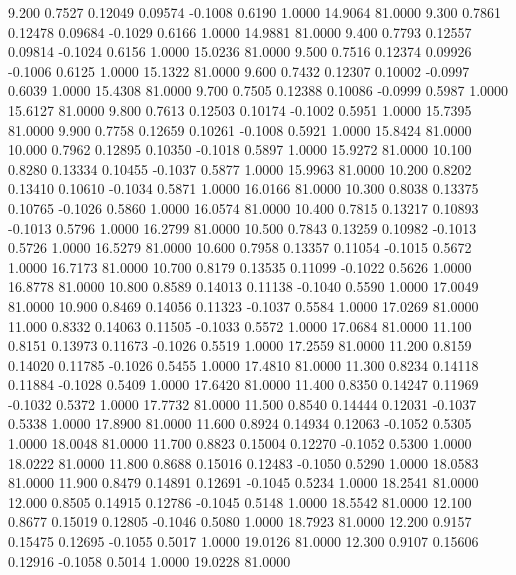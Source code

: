    9.200   0.7527   0.12049   0.09574  -0.1008   0.6190   1.0000  14.9064  81.0000
   9.300   0.7861   0.12478   0.09684  -0.1029   0.6166   1.0000  14.9881  81.0000
   9.400   0.7793   0.12557   0.09814  -0.1024   0.6156   1.0000  15.0236  81.0000
   9.500   0.7516   0.12374   0.09926  -0.1006   0.6125   1.0000  15.1322  81.0000
   9.600   0.7432   0.12307   0.10002  -0.0997   0.6039   1.0000  15.4308  81.0000
   9.700   0.7505   0.12388   0.10086  -0.0999   0.5987   1.0000  15.6127  81.0000
   9.800   0.7613   0.12503   0.10174  -0.1002   0.5951   1.0000  15.7395  81.0000
   9.900   0.7758   0.12659   0.10261  -0.1008   0.5921   1.0000  15.8424  81.0000
  10.000   0.7962   0.12895   0.10350  -0.1018   0.5897   1.0000  15.9272  81.0000
  10.100   0.8280   0.13334   0.10455  -0.1037   0.5877   1.0000  15.9963  81.0000
  10.200   0.8202   0.13410   0.10610  -0.1034   0.5871   1.0000  16.0166  81.0000
  10.300   0.8038   0.13375   0.10765  -0.1026   0.5860   1.0000  16.0574  81.0000
  10.400   0.7815   0.13217   0.10893  -0.1013   0.5796   1.0000  16.2799  81.0000
  10.500   0.7843   0.13259   0.10982  -0.1013   0.5726   1.0000  16.5279  81.0000
  10.600   0.7958   0.13357   0.11054  -0.1015   0.5672   1.0000  16.7173  81.0000
  10.700   0.8179   0.13535   0.11099  -0.1022   0.5626   1.0000  16.8778  81.0000
  10.800   0.8589   0.14013   0.11138  -0.1040   0.5590   1.0000  17.0049  81.0000
  10.900   0.8469   0.14056   0.11323  -0.1037   0.5584   1.0000  17.0269  81.0000
  11.000   0.8332   0.14063   0.11505  -0.1033   0.5572   1.0000  17.0684  81.0000
  11.100   0.8151   0.13973   0.11673  -0.1026   0.5519   1.0000  17.2559  81.0000
  11.200   0.8159   0.14020   0.11785  -0.1026   0.5455   1.0000  17.4810  81.0000
  11.300   0.8234   0.14118   0.11884  -0.1028   0.5409   1.0000  17.6420  81.0000
  11.400   0.8350   0.14247   0.11969  -0.1032   0.5372   1.0000  17.7732  81.0000
  11.500   0.8540   0.14444   0.12031  -0.1037   0.5338   1.0000  17.8900  81.0000
  11.600   0.8924   0.14934   0.12063  -0.1052   0.5305   1.0000  18.0048  81.0000
  11.700   0.8823   0.15004   0.12270  -0.1052   0.5300   1.0000  18.0222  81.0000
  11.800   0.8688   0.15016   0.12483  -0.1050   0.5290   1.0000  18.0583  81.0000
  11.900   0.8479   0.14891   0.12691  -0.1045   0.5234   1.0000  18.2541  81.0000
  12.000   0.8505   0.14915   0.12786  -0.1045   0.5148   1.0000  18.5542  81.0000
  12.100   0.8677   0.15019   0.12805  -0.1046   0.5080   1.0000  18.7923  81.0000
  12.200   0.9157   0.15475   0.12695  -0.1055   0.5017   1.0000  19.0126  81.0000
  12.300   0.9107   0.15606   0.12916  -0.1058   0.5014   1.0000  19.0228  81.0000
